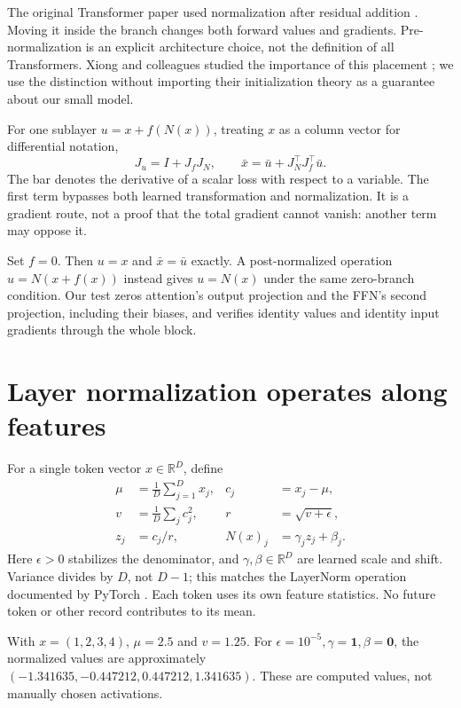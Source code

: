 The original Transformer paper used normalization after residual addition \cite{vaswani}. Moving it inside the branch changes both forward values and gradients. Pre-normalization is an explicit architecture choice, not the definition of all Transformers. Xiong and colleagues studied the importance of this placement \cite{xiong}; we use the distinction without importing their initialization theory as a guarantee about our small model.

For one sublayer $u=x+f(N(x))$, treating $x$ as a column vector for differential notation,
\begin{equation}
J_u=I+J_fJ_N,\qquad
\bar x=\bar u+J_N^\top J_f^\top\bar u. \label{eq:residualgrad}
\end{equation}
The bar denotes the derivative of a scalar loss with respect to a variable. The first term bypasses both learned transformation and normalization. It is a gradient route, not a proof that the total gradient cannot vanish: another term may oppose it.

Set $f=0$. Then $u=x$ and $\bar x=\bar u$ exactly. A post-normalized operation $u=N(x+f(x))$ instead gives $u=N(x)$ under the same zero-branch condition. Our test zeros attention's output projection and the FFN's second projection, including their biases, and verifies identity values and identity input gradients through the whole block.

\section{Layer normalization operates along features}
For a single token vector $x\in\mathbb R^D$, define
\begin{align}
\mu&=\frac1D\sum_{j=1}^D x_j,&
c_j&=x_j-\mu,\\
v&=\frac1D\sum_j c_j^2,&
r&=\sqrt{v+\epsilon},\\
z_j&=c_j/r,&
N(x)_j&=\gamma_jz_j+\beta_j. \label{eq:norm}
\end{align}
Here $\epsilon>0$ stabilizes the denominator, and $\gamma,\beta\in\mathbb R^D$ are learned scale and shift. Variance divides by $D$, not $D-1$; this matches the LayerNorm operation documented by PyTorch \cite{layernorm}. Each token uses its own feature statistics. No future token or other record contributes to its mean.

With $x=(1,2,3,4)$, $\mu=2.5$ and $v=1.25$. For $\epsilon=10^{-5},\gamma=\mathbf1,\beta=\mathbf0$, the normalized values are approximately
$(-1.341635,-0.447212,0.447212,1.341635)$. These are computed values, not manually chosen activations.

